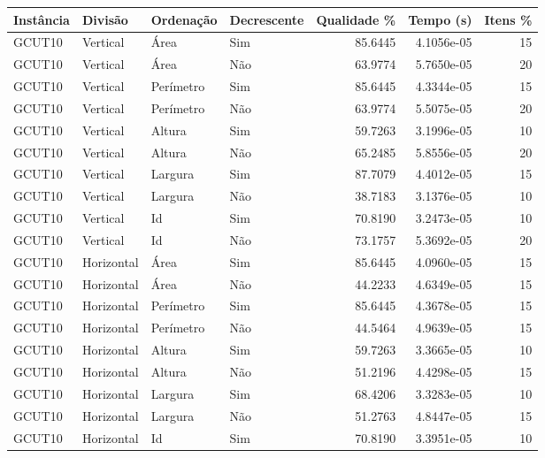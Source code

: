 \begin{tabular}{llllrrr}
\hline
Instância & Divisão     & Ordenação & Decrescente & Qualidade \% & Tempo (s)  & Itens \% \\
\hline
GCUT10    & Vertical    & Área      & Sim         & 85.6445      & 4.1056e-05 & 15       \\
GCUT10    & Vertical    & Área      & Não         & 63.9774      & 5.7650e-05 & 20       \\
GCUT10    & Vertical    & Perímetro & Sim         & 85.6445      & 4.3344e-05 & 15       \\
GCUT10    & Vertical    & Perímetro & Não         & 63.9774      & 5.5075e-05 & 20       \\
GCUT10    & Vertical    & Altura    & Sim         & 59.7263      & 3.1996e-05 & 10       \\
GCUT10    & Vertical    & Altura    & Não         & 65.2485      & 5.8556e-05 & 20       \\
GCUT10    & Vertical    & Largura   & Sim         & 87.7079      & 4.4012e-05 & 15       \\
GCUT10    & Vertical    & Largura   & Não         & 38.7183      & 3.1376e-05 & 10       \\
GCUT10    & Vertical    & Id        & Sim         & 70.8190      & 3.2473e-05 & 10       \\
GCUT10    & Vertical    & Id        & Não         & 73.1757      & 5.3692e-05 & 20       \\
GCUT10    & Horizontal  & Área      & Sim         & 85.6445      & 4.0960e-05 & 15       \\
GCUT10    & Horizontal  & Área      & Não         & 44.2233      & 4.6349e-05 & 15       \\
GCUT10    & Horizontal  & Perímetro & Sim         & 85.6445      & 4.3678e-05 & 15       \\
GCUT10    & Horizontal  & Perímetro & Não         & 44.5464      & 4.9639e-05 & 15       \\
GCUT10    & Horizontal  & Altura    & Sim         & 59.7263      & 3.3665e-05 & 10       \\
GCUT10    & Horizontal  & Altura    & Não         & 51.2196      & 4.4298e-05 & 15       \\
GCUT10    & Horizontal  & Largura   & Sim         & 68.4206      & 3.3283e-05 & 10       \\
GCUT10    & Horizontal  & Largura   & Não         & 51.2763      & 4.8447e-05 & 15       \\
GCUT10    & Horizontal  & Id        & Sim         & 70.8190      & 3.3951e-05 & 10       \\

\end{tabular}
